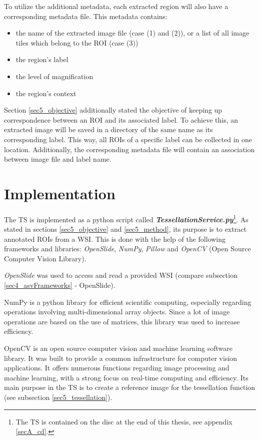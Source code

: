 To utilize the additional metadata, each extracted region will also have a corresponding metadata file. This metadata contains:
\begin{itemize}
	\item the name of the extracted image file (case (1) and (2)), or a list of all image tiles which belong to the ROI (case (3))
	\item the region's label
	\item the level of magnification
	\item the region's context
\end{itemize}

Section \ref{sec5_objective} additionally stated the objective of keeping up correspondence between an ROI and its associated label. To achieve this, an extracted image will be saved in a directory of the same name as its corresponding label. This way, all ROIs of a specific label can be collected in one location. Additionally, the corresponding metadata file will contain an association between image file and label name.


\section{Implementation}
\label{sec5_impl}
The TS is implemented as a python script called \textbf{\emph{TessellationService.py}}\footnote{
	The TS is contained on the disc at the end of this thesis, see appendix \ref{secA_cd}.
}. As stated in sections \ref{sec5_objective} and \ref{sec5_method}, its purpose is to extract annotated ROIs from a WSI. This is done with the help of the following frameworks and libraries: \emph{OpenSlide}, \emph{NumPy}, \emph{Pillow} and \emph{OpenCV} (Open Source Computer Vision Library).

\emph{OpenSlide} was used to access and read a provided WSI (compare subsection \ref{sec4_asvFrameworks} - OpenSlide).

NumPy is a python library for efficient scientific computing, especially regarding operations involving multi-dimensional array objects\cite{Walt11}. Since a lot of image operations are based on the use of matrices, this library was used to increase efficiency.

OpenCV is an open source computer vision and machine learning software library. It was built to provide a common infrastructure for computer vision applications. It offers numerous functions regarding image processing and machine learning, with a strong focus on real-time computing and efficiency\cite{Bradski08}. Its main purpose in the TS is to create a reference image for the tessellation function (see subsection \ref{sec5_tessellation}).

